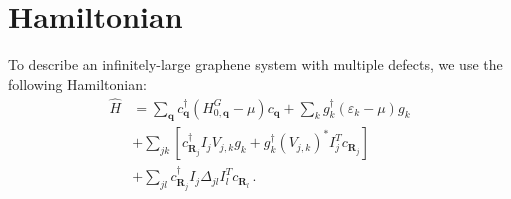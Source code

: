 \documentclass[aps,prb,superscriptaddress,preprint,floatfix]{revtex4-1}
\begin{document}
	
\section{Hamiltonian}

To describe an infinitely-large graphene system with multiple defects, we use the following Hamiltonian:
%
\begin{align}
    \hat{H} &= \sum_{\mathbf{q}} c^\dagger_{\mathbf{q}}
    \left(H_{0,\mathbf{q}}^G - \mu\right)
    c_{\mathbf{q}}
    +
    \sum_{ k} g_{ k}^\dagger \left(\varepsilon_k - \mu\right)  g_{ k}
    \nonumber
    \\
    &+
    \sum_{ jk} 
    \left[
    c^\dagger_{\mathbf{R}_j}I_j V_{j,k} g_{ k} 
    + 
    g_{ k}^\dagger \left(V_{j,k}\right)^* I_j^T c_{\mathbf{R}_j}
    \right]
    \nonumber
    \\
    &+  
    \sum_{jl} c_{\mathbf{R}_j}^\dagger I_j \Delta_{jl} I^T_lc_{\mathbf{R}_l}
    \,.
    \label{eqn:H_QFT}
\end{align}
%
\end{document}
